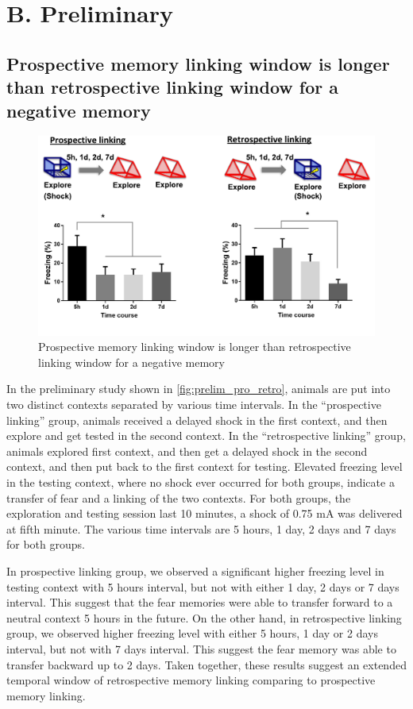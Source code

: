 \documentclass[master.tex]{subfiles}
\begin{document}
\section*{B. Preliminary}

\subsection*{Prospective memory linking window is longer than retrospective
  linking window for a negative memory}

\begin{figure}
  \centering \includegraphics[scale = .4]{Figures/pro_retro_prelim.pdf}
  \caption{\footnotesize Prospective memory linking window is longer than
    retrospective linking window for a negative memory}
  \label{fig:prelim_pro_retro}
\end{figure}

In the preliminary study shown in \autoref{fig:prelim_pro_retro}, animals are
put into two distinct contexts separated by various time intervals. In the
``prospective linking'' group, animals received a delayed shock in the first
context, and then explore and get tested in the second context. In the
``retrospective linking'' group, animals explored first context, and then get a
delayed shock in the second context, and then put back to the first context for
testing. Elevated freezing level in the testing context, where no shock ever
occurred for both groups, indicate a transfer of fear and a linking of the two
contexts. For both groups, the exploration and testing session last 10 minutes,
a shock of 0.75 mA was delivered at fifth minute. The various time intervals are
5 hours, 1 day, 2 days and 7 days for both groups.

In prospective linking group, we observed a significant higher freezing level in
testing context with 5 hours interval, but not with either 1 day, 2 days or 7
days interval. This suggest that the fear memories were able to transfer forward
to a neutral context 5 hours in the future. On the other hand, in retrospective
linking group, we observed higher freezing level with either 5 hours, 1 day or 2
days interval, but not with 7 days interval. This suggest the fear memory was
able to transfer backward up to 2 days. Taken together, these results suggest an
extended temporal window of retrospective memory linking comparing to
prospective memory linking.
\end{document}
